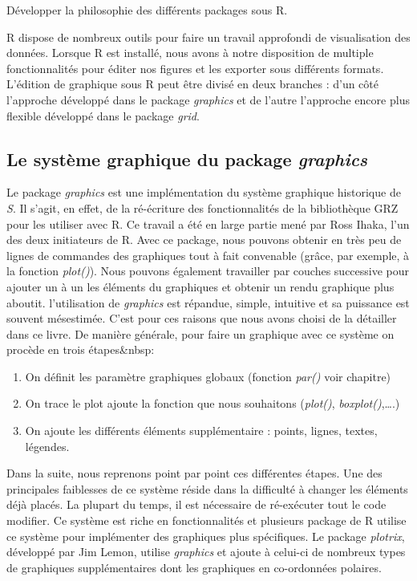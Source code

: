 \documentclass[]{article}
\providecommand{\tightlist}{%
  \setlength{\itemsep}{0pt}\setlength{\parskip}{0pt}}
\begin{document}
Développer la philosophie des différents packages sous R.

R dispose de nombreux outils pour faire un travail approfondi de visualisation des données. Lorsque R est installé, nous avons à notre disposition de multiple fonctionnalités pour éditer nos figures et les exporter sous différents formats. L'édition de graphique sous R peut être divisé en deux branches : d'un côté l'approche développé dans le package \emph{graphics} et de l'autre l'approche encore plus flexible développé dans le package \emph{grid}.

\hypertarget{le-systuxe8me-graphique-du-package-graphics}{%
\subsection{\texorpdfstring{Le système graphique du package \emph{graphics}}{Le système graphique du package graphics}}\label{le-systuxe8me-graphique-du-package-graphics}}

Le package \emph{graphics} est une implémentation du système graphique historique de \emph{S}. Il s'agit, en effet, de la ré-écriture des fonctionnalités de la bibliothèque GRZ pour les utiliser avec R. Ce travail a été en large partie mené par Ross Ihaka, l'un des deux initiateurs de R. Avec ce package, nous pouvons obtenir en très peu de lignes de commandes des graphiques tout à fait convenable (grâce, par exemple, à la fonction \emph{plot()}). Nous pouvons également travailler par couches successive pour ajouter un à un les éléments du graphiques et obtenir un rendu graphique plus aboutit. l'utilisation de \emph{graphics} est répandue, simple, intuitive et sa puissance est souvent mésestimée. C'est pour ces raisons que nous avons choisi de la détailler dans ce livre. De manière générale, pour faire un graphique avec ce système on procède en trois étapes\&nbsp:

\begin{enumerate}
\def\labelenumi{\arabic{enumi}.}
\tightlist
\item
  On définit les paramètre graphiques globaux (fonction \emph{par()} voir chapitre)
\item
  On trace le plot ajoute la fonction que nous souhaitons (\emph{plot()}, \emph{boxplot()},\ldots{}.)
\item
  On ajoute les différents éléments supplémentaire : points, lignes, textes, légendes.
\end{enumerate}

Dans la suite, nous reprenons point par point ces différentes étapes. Une des
principales faiblesses de ce système réside dans la difficulté à changer les
éléments déjà placés. La plupart du temps, il est nécessaire de ré-exécuter tout
le code modifier. Ce système est riche en fonctionnalités et plusieurs package
de R utilise ce système pour implémenter des graphiques plus spécifiques. Le
package \emph{plotrix}, développé par Jim Lemon, utilise \emph{graphics} et ajoute à
celui-ci de nombreux types de graphiques supplémentaires dont les graphiques en
co-ordonnées polaires.
\end{document}
